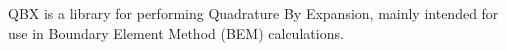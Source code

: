 Q\+B\+X is a library for performing Quadrature By Expansion, mainly intended for use in Boundary Element Method (B\+E\+M) calculations. 